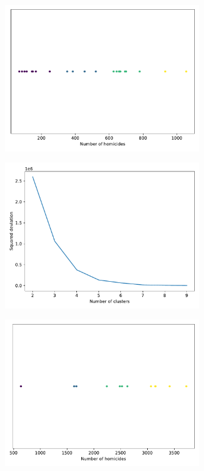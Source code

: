 \begin{figure}[h!]
\centering
\includegraphics[width=0.75\textwidth]{figs/clusters-districts.pdf}
\caption{}\label{fig:districtclusters}
\end{figure}

\begin{figure}[h!]
\centering
\includegraphics[width=0.75\textwidth]{figs/elbow-areas.pdf}
\caption{}\label{fig:areaelbow}
\end{figure}

\begin{figure}[h!]
\centering
\includegraphics[width=0.75\textwidth]{figs/clusters-areas.pdf}
\caption{}\label{fig:areaclusters}
\end{figure}




